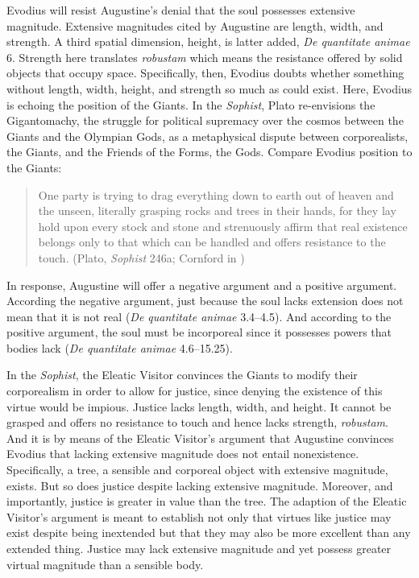 \documentclass[12pt]{article}
\begin{document}
Evodius will resist Augustine’s denial that the soul possesses extensive magnitude. Extensive magnitudes cited by Augustine are length, width, and strength. A third spatial dimension, height, is latter added, \emph{De quantitate animae} 6. Strength here translates \emph{robustam} which means the resistance offered by solid objects that occupy space. Specifically, then, Evodius doubts whether something without length, width, height, and strength so much as could exist. 
Here, Evodius is echoing the position of the Giants. In the \emph{Sophist}, Plato re-envisions the Gigantomachy, the struggle for political supremacy over the cosmos between the Giants and the Olympian Gods, as a metaphysical dispute between corporealists, the Giants, and the Friends of the Forms, the Gods. Compare Evodius position to the Giants:
\begin{quote}
	One party is trying to drag everything down to earth out of heaven and the unseen, literally grasping rocks and trees in their hands, for they lay hold upon every stock and stone and strenuously affirm that real existence belongs only to that which can be handled and offers resistance to the touch. (Plato, \emph{Sophist} 246a; Cornford in \citealt[990]{Hamilton:1989fk})
\end{quote}
	
In response, Augustine will offer a negative argument and a positive argument. According the negative argument, just because the soul lacks extension does not mean that it is not real (\emph{De quantitate animae} 3.4–4.5). And according to the positive argument, the soul must be incorporeal since it possesses powers that bodies lack (\emph{De quantitate animae} 4.6–15.25).

In the \emph{Sophist}, the Eleatic Visitor convinces the Giants to modify their corporealism in order to allow for justice, since denying the existence of this virtue would be impious. Justice lacks length, width, and height. It cannot be grasped and offers no resistance to touch and hence lacks strength, \emph{robustam}. And it is by means of the Eleatic Visitor’s argument that Augustine convinces Evodius that lacking extensive magnitude does not entail nonexistence. Specifically, a tree, a sensible and corporeal object with extensive magnitude, exists. But so does justice despite lacking extensive magnitude. Moreover, and importantly, justice is greater in value than the tree. The adaption of the Eleatic Visitor’s argument is meant to establish not only that virtues like justice may exist despite being inextended but that they may also be more excellent than any extended thing. Justice may lack extensive magnitude and yet possess greater virtual magnitude than a sensible body. 
\end{document}
